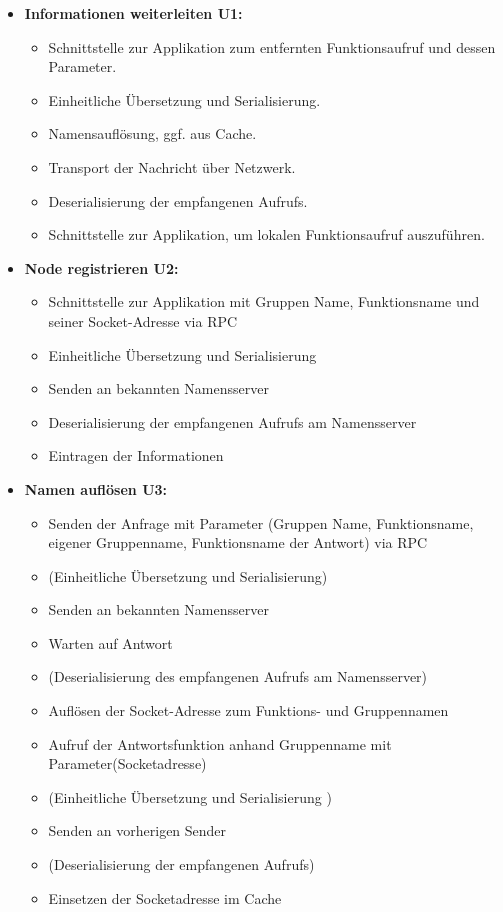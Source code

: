 \begin{itemize}
	\item \textbf{Informationen weiterleiten U1:}\\
	\begin{itemize}
		\item Schnittstelle zur Applikation zum entfernten Funktionsaufruf und dessen Parameter.
		\item Einheitliche Übersetzung und Serialisierung. 
		\item Namensauflösung, ggf. aus Cache.
		\item Transport der Nachricht über Netzwerk. 
		\item Deserialisierung der empfangenen Aufrufs.
		\item Schnittstelle zur Applikation, um lokalen Funktionsaufruf auszuführen.  
	\end{itemize}
	
	\item \textbf{Node registrieren U2:}\\
	\begin{itemize}
		\item Schnittstelle zur Applikation mit Gruppen Name, Funktionsname und seiner Socket-Adresse via RPC
		\item Einheitliche Übersetzung und Serialisierung 
		\item Senden an bekannten Namensserver
		\item Deserialisierung der empfangenen Aufrufs am Namensserver
		\item Eintragen der Informationen
	\end{itemize}
	
	\item \textbf{Namen auflösen U3:}\\
	\begin{itemize}
		\item Senden der Anfrage mit Parameter (Gruppen Name, Funktionsname, eigener Gruppenname, Funktionsname der Antwort) via RPC
		\item (Einheitliche Übersetzung und Serialisierung)
		\item Senden an bekannten Namensserver
		\item Warten auf Antwort
		\item (Deserialisierung des empfangenen Aufrufs am Namensserver)
		\item Auflösen der Socket-Adresse zum Funktions- und Gruppennamen
		\item Aufruf der Antwortsfunktion anhand Gruppenname mit Parameter(Socketadresse)
		\item (Einheitliche Übersetzung und Serialisierung )
		\item Senden an vorherigen Sender
		\item (Deserialisierung der empfangenen Aufrufs)
		\item Einsetzen der Socketadresse im Cache
	\end{itemize}
		

\end{itemize}
